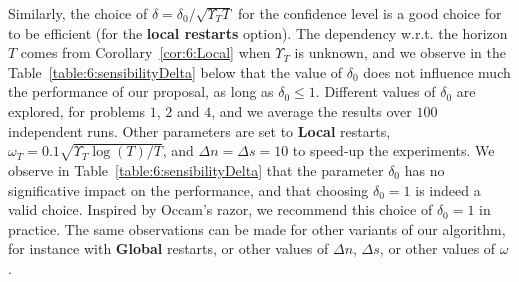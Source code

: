 Similarly, the choice of $\delta=\delta_0 / \sqrt{\Upsilon_T T}$ for the confidence level is a good choice for \GLRklUCB{} to be efficient (for the \textbf{local restarts} option).
The dependency w.r.t. the horizon $T$ comes from Corollary~\ref{cor:6:Local} when $\Upsilon_T$ is unknown, and we observe in the Table~\ref{table:6:sensibilityDelta} below that the value of $\delta_0$ does not influence much the performance of our proposal, as long as $\delta_0\leq1$.
Different values of $\delta_0$ are explored, for problems $1$, $2$ and $4$, and we average the results over $100$ independent runs.
Other parameters are set to \textbf{Local} restarts, $\omega_T = 0.1 \sqrt{\Upsilon_T\log(T)/T}$, and $\Delta n = \Delta s = 10$ to speed-up the experiments.
%
We observe in Table~\ref{table:6:sensibilityDelta} that the parameter $\delta_0$ has no significative impact on the performance,
and that choosing $\delta_0 = 1$ is indeed a valid choice.
Inspired by Occam's razor, we recommend this choice of $\delta_0=1$ in practice.
%
The same observations can be made for other variants of our algorithm, for instance with \textbf{Global} restarts, or other values of $\Delta n$, $\Delta s$, or other values of $\omega$.

